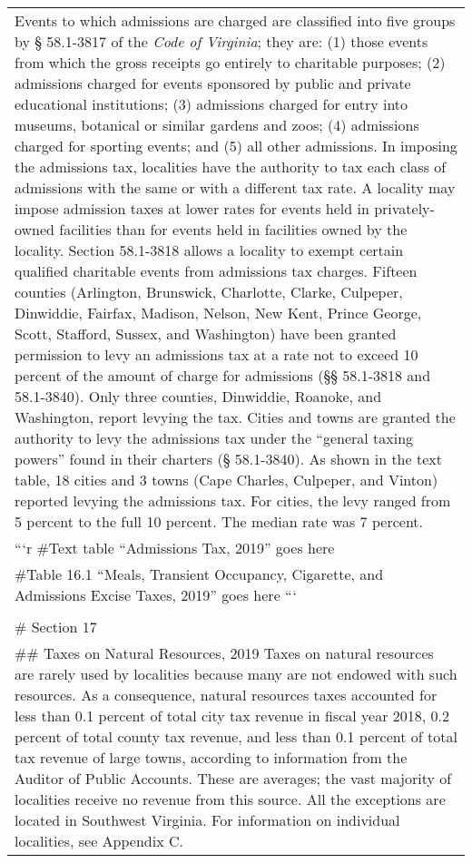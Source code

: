 \documentclass[
]{book}
\begin{document}
\begin{longtable}[]{@{}
  >{\raggedright\arraybackslash}p{}@{}}
\textbar{}
\textbar{} Events to which admissions are charged are classified into five groups by § 58.1-3817 of the \emph{Code of Virginia}; they are: (1) those events from which the gross receipts go entirely to charitable purposes; (2) admissions charged for events sponsored by public and private educational institutions; (3) admissions charged for entry into museums, botanical or similar gardens and zoos; (4) admissions charged for sporting events; and (5) all other admissions.
\textbar{}
\textbar{} In imposing the admissions tax, localities have the authority to tax each class of admissions with the same or with a different tax rate. A locality may impose admission taxes at lower rates for events held in privately-owned facilities than for events held in facilities owned by the locality. Section 58.1-3818 allows a locality to exempt certain qualified charitable events from admissions tax charges. Fifteen counties (Arlington, Brunswick, Charlotte, Clarke, Culpeper, Dinwiddie, Fairfax, Madison, Nelson, New Kent, Prince George, Scott, Stafford, Sussex, and Washington) have been granted permission to levy an admissions tax at a rate not to exceed 10 percent of the amount of charge for admissions (§§ 58.1-3818 and 58.1-3840). Only three counties, Dinwiddie, Roanoke, and Washington, report levying the tax.
\textbar{}
\textbar{} Cities and towns are granted the authority to levy the admissions tax under the ``general taxing powers'' found in their charters (§ 58.1-3840). As shown in the text table, 18 cities and 3 towns (Cape Charles, Culpeper, and Vinton) reported levying the admissions tax. For cities, the levy ranged from 5 percent to the full 10 percent. The median rate was 7 percent. \\
```r
\#Text table ``Admissions Tax, 2019'' goes here \\
\#Table 16.1 ``Meals, Transient Occupancy, Cigarette, and Admissions Excise Taxes, 2019'' goes here
``` \\
 \\
\# Section 17 \\
\#\# Taxes on Natural Resources, 2019
\textbar{} Taxes on natural resources are rarely used by localities because many are not endowed with such resources. As a consequence, natural resources taxes accounted for less than 0.1 percent of total city tax revenue in fiscal year 2018, 0.2 percent of total county tax revenue, and less than 0.1 percent of total tax revenue of large towns, according to information from the Auditor of Public Accounts. These are averages; the vast majority of localities receive no revenue from this source. All the exceptions are located in Southwest Virginia. For information on individual localities, see Appendix C.

\end{longtable}
\end{document}
